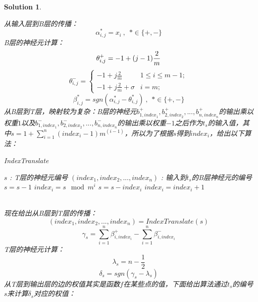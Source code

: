 \documentclass[a4paper,UTF8]{article}
\numberwithin{equation}{section}
\newtheorem*{solution}{Solution}
\begin{document}
\begin{solution}
\begin{enumerate}[ {(}1{)}]
从输入层到B层的传播：
\begin{equation}
\alpha_{i,j}^* = x_i\ ,\ \ *\in \{+,-\}
\end{equation}
B层的神经元计算：
\begin{equation}
\theta_{i,j}^+ = -1 + (j-1)\frac{2}{m}\\
\end{equation}
\begin{equation}
\theta_{i,j}^- =
\begin{cases}
-1 + j\frac{2}{m} & 1\leq i\leq m-1;\\
-1 + j\frac{2}{m} + \sigma & i = m;
\end{cases}
\end{equation}
\begin{equation}
\beta_{i,j}^* = sgn(\alpha_{i,j}^* - \theta_{i,j}^*)\ ,\ \ *\in \{+, -\}
\end{equation}
从B层到T层，映射较为复杂：B层的神经元$b_{1, index_1}^+,b_{2,index_2}^+,...,b_{n,index_n}^+$的输出乘以权重$1$以及$b_{1, index_1}^-,b_{2,index_2}^-,...,b_{n,index_n}^-$的输出乘以权重$-1$之后作为$t_s$的输入值，其中$s= 1+\sum_{i=1}^{n}(index_i-1)m^{(i-1)} $，所以为了根据$s$得到$index_i$，给出以下算法：
\begin{algorithm}[h]  
	\caption{IndexTranslate}  
	\begin{algorithmic}[1]  
		\Require  
		$s$ : T层的神经元编号 
		\Ensure  
		$(index_1,index_2,...,index_n)$ : 输入到$t_s$的B层神经元的编号
		\State $s = s-1$ 
		\State $index_i = s \mod m^i$
		\State $s = s - index_i$
		\State $index_i = index_i + 1$
		\EndFor
		\label{code:recentEnd}  
	\end{algorithmic}  
\end{algorithm}\\
现在给出从B层到T层的传播：
\begin{equation}
(index_1, index_2,...,index_n) = IndexTranslate(s)
\end{equation}
\begin{equation}
\gamma_s = \sum_{i=1}^{n}\beta_{i,index_i}^+ - \sum_{i=1}^{n}\beta_{i,index_i}^-
\end{equation}
T层的神经元计算：\\
\begin{equation}
\lambda_s = n - \frac{1}{2}
\end{equation}
\begin{equation}
\delta_s = sgn(\gamma_s - \lambda_s)
\end{equation}
从T层到输出层的边的权值其实是函数$f$在某些点的值，下面给出算法通过$t_s$的编号$s$来计算$\delta_s$对应的权值：

\end{enumerate}
\end{solution}
\end{document}
